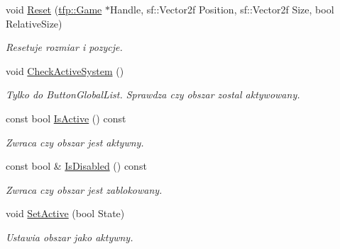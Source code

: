\begin{DoxyCompactItemize}
void \mbox{\hyperlink{classtfp_1_1_input_area_a908d0161d3449c13f11fc5a5a2cfdb54}{Reset}} (\mbox{\hyperlink{classtfp_1_1_game}{tfp\+::\+Game}} $\ast$Handle, sf\+::\+Vector2f Position, sf\+::\+Vector2f Size, bool Relative\+Size)
\begin{DoxyCompactList}\small\item\em Resetuje rozmiar i pozycje. \end{DoxyCompactList}\item 
\mbox{\label{classtfp_1_1_input_area_ab86447306eab62ea548f57ed82c83b03}} 
void \mbox{\hyperlink{classtfp_1_1_input_area_ab86447306eab62ea548f57ed82c83b03}{Check\+Active\+System}} ()
\begin{DoxyCompactList}\small\item\em Tylko do Button\+Global\+List. Sprawdza czy obszar zostal aktywowany. \end{DoxyCompactList}\item 
\mbox{\label{classtfp_1_1_input_area_ab64a841492e82c818d7916906efba030}} 
const bool \mbox{\hyperlink{classtfp_1_1_input_area_ab64a841492e82c818d7916906efba030}{Is\+Active}} () const
\begin{DoxyCompactList}\small\item\em Zwraca czy obszar jest aktywny. \end{DoxyCompactList}\item 
\mbox{\label{classtfp_1_1_input_area_a9760a63151dd18ae2cf93e06152be12d}} 
const bool \& \mbox{\hyperlink{classtfp_1_1_input_area_a9760a63151dd18ae2cf93e06152be12d}{Is\+Disabled}} () const
\begin{DoxyCompactList}\small\item\em Zwraca czy obszar jest zablokowany. \end{DoxyCompactList}\item 
\mbox{\label{classtfp_1_1_input_area_a7b35ed48b6e6bae4a1385c7c712bd99f}} 
void \mbox{\hyperlink{classtfp_1_1_input_area_a7b35ed48b6e6bae4a1385c7c712bd99f}{Set\+Active}} (bool State)
\begin{DoxyCompactList}\small\item\em Ustawia obszar jako aktywny. \end{DoxyCompactList}\item 
\mbox{\label{classtfp_1_1_input_area_ac962a42ba6a47804eae2fd98d7d30d3f}} 

\end{DoxyCompactItemize}
